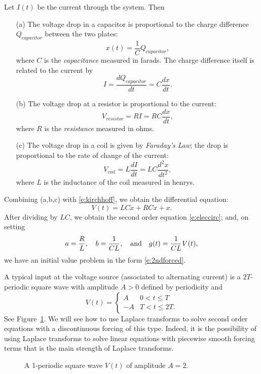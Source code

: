 \documentclass{ximera}
\begin{document}
Let $I(t)$ be the current through the system.  Then 
\begin{itemize}
\item[(a)]  The voltage drop in a capacitor is proportional to the charge 
difference $Q_{capacitor}$ between the two plates:
\[
x(t) = \frac{1}{C}Q_{capacitor},
\]
where $C$ is the {\em capacitance\/} measured in farads.  The charge 
difference itself is related to the current by 
\[
I = \frac{dQ_{capacitor}}{dt} = C\frac{dx}{dt}.
\]
\item[(b)]  The voltage drop at a resistor is proportional to the current:	
\[
V_{resistor} = RI = RC\frac{dx}{dt},
\]
where $R$ is the {\em resistance\/} measured in ohms.
\item[(c)]  The voltage drop in a coil is given by 
{\em Faraday's Law}; 
the drop is proportional to the rate of change of the current:
\[
V_{coil} = L\frac{dI}{dt} = LC\frac{d^2x}{dt^2},
\]
where $L$ is the inductance of the coil measured in henrys.
\end{itemize}

Combining (a,b,c) with \eqref{e:kirchhoff}, we obtain the differential equation:
\[
V(t) = LC\ddot{x} + RC\dot{x} +  x.
\]
After dividing by $LC$, we obtain the second order equation \eqref{e:eleccirc};
and, on setting 
\[
a = \frac{R}{L}, \quad b = \frac{1}{CL}, \quad\mbox{and}\quad g(t) = \frac{1}{CL}V(t),
\] 
we have an initial value problem in the form \eqref{e:2ndforced}.

A typical input at the voltage source 
(associated to alternating current) is 
a $2T$-periodic square wave with amplitude $A>0$ defined by periodicity and
\[
V(t) = \left\{\begin{array}{rl} A & 0<t\leq T\\
			       -A & T<t\leq 2T.
	\end{array}\right.
\]
See Figure~\ref{fig:sq}.  We will see how to use Laplace transforms to solve 
second order equations with a discontinuous forcing 
of this type.  Indeed,
it is the possibility of using Laplace transforms to solve linear equations 
with piecewise smooth forcing terms that is 
the main strength of Laplace
transforms.

\begin{figure}[htb]
           \centerline{%
           }
           \caption{A 1-periodic square wave $V(t)$ of amplitude $A=2$.}
           \label{fig:sq}
\end{figure}
\end{document}
